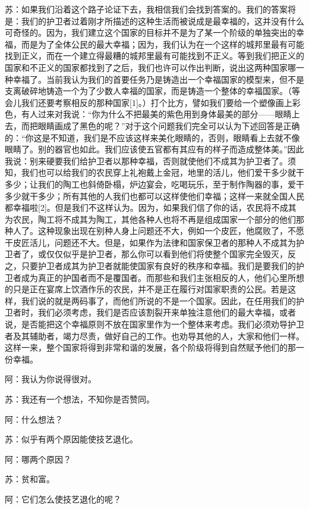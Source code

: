 \documentclass[12pt,oneside]{book}
\begin{document}
苏：如果我们沿着这个路子论证下去，我相信我们会找到答案的。我们的答案将是：我们的护卫者过着刚才所描述的这种生活而被说成是最幸福的，这并没有什么可奇怪的。因为，我们建立这个国家的目标并不是为了某一个阶级的单独突出的幸福，而是为了全体公民的最大幸福；因为，我们认为在一个这样的城邦里最有可能找到正义，而在一个建立得最糟的城邦里最有可能找到不正义。等到我们把正义的国家和不正义的国家都找到了之后，我们也许可以作出判断，说出这两种国家哪一种幸福了。当前我认为我们的首要任务乃是铸造出一个幸福国家的模型来，但不是支离破碎地铸造一个为了少数人幸福的国家，而是铸造一个整体的幸福国家。（等会儿我们还要考察相反的那种国家[1]。）打个比方，譬如我们要给一个塑像画上彩色，有人过来对我说：“你为什么不把最美的紫色用到身体最美的部分——眼睛上去，而把眼睛画成了黑色的呢？”对于这个问题我们完全可以认为下述回答是正确的：“你这是不知道，我们是不应该这样来美化眼睛的，否则，眼睛看上去就不像眼睛了。别的器官也如此。我们应该使五官都有其应有的样子而造成整体美。”因此我说：别来硬要我们给护卫者以那种幸福，否则就使他们不成其为护卫者了。须知，我们也可以给我们的农民穿上礼袍戴上金冠，地里的活儿，他们爱干多少就干多少；让我们的陶工也斜倚卧榻，炉边宴会，吃喝玩乐，至于制作陶器的事，爱干多少就干多少；所有其他的人我们也都可以这样使他们幸福；这样一来就全国人民都幸福啦[2]。但是我们不这样认为。因为，如果我们信了你的话，农民将不成其为农民，陶工将不成其为陶工，其他各种人也将不再是组成国家一个部分的他们那种人了。这种现象出现在别种人身上问题还不大，例如一个皮匠，他腐败了，不愿干皮匠活儿，问题还不大。但是，如果作为法律和国家保卫者的那种人不成其为护卫者了，或仅仅似乎是护卫者，那么你可以看到他们将使整个国家完全毁灭，反之，只要护卫者成其为护卫者就能使国家有良好的秩序和幸福。我们是要我们的护卫者成为真正的护国者而不是覆国者。而那些和我们主张相反的人，他们心里所想的只是正在宴席上饮酒作乐的农民，并不是正在履行对国家职责的公民。若是这样，我们说的就是两码事了，而他们所说的不是一个国家。因此，在任用我们的护卫者时，我们必须考虑，我们是否应该割裂开来单独注意他们的最大幸福，或者说，是否能把这个幸福原则不放在国家里作为一个整体来考虑。我们必须劝导护卫者及其辅助者，竭力尽责，做好自己的工作。也劝导其他的人，大家和他们一样。这样一来，整个国家将得到非常和谐的发展，各个阶级将得到自然赋予他们的那一份幸福。

阿：我认为你说得很对。

苏：我还有一个想法，不知你是否赞同。

阿：什么想法？

苏：似乎有两个原因能使技艺退化。

阿：哪两个原因？

苏：贫和富。

阿：它们怎么使技艺退化的呢？
\end{document}
